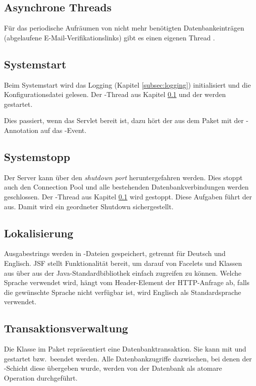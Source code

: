 \subsection{Asynchrone Threads}\label{subsec:threads}
Für das periodische Aufräumen von nicht mehr benötigten Datenbankeinträgen (abgelaufene E-Mail-Verifikationslinks) gibt es einen eigenen Thread .

\subsection{Systemstart}\label{subsec:systemstart}
Beim Systemstart wird das Logging (Kapitel \ref{subsec:logging}) initialisiert und die Konfigurationsdatei gelesen. Der -Thread aus Kapitel \ref{subsec:threads} und der  werden gestartet.

Dies passiert, wenn das Servlet bereit ist, dazu hört der  aus dem Paket  mit der -Annotation auf das -Event.

\subsection{Systemstopp}\label{subsec:systemstopp}
Der Server kann über den \emph{shutdown port} heruntergefahren werden. Dies stoppt auch den Connection Pool und alle bestehenden Datenbankverbindungen werden geschlossen.
Der -Thread aus Kapitel \ref{subsec:threads} wird gestoppt.
Diese Aufgaben führt der  aus.
Damit wird ein geordneter Shutdown sichergestellt.

\subsection{Lokalisierung}\label{subsec:lokalisierung}
Ausgabestrings werden in -Dateien gespeichert, getrennt für Deutsch und Englisch.
JSF stellt Funktionalität bereit, um darauf von Facelets und Klassen aus über  aus der Java-Standardbibliothek einfach zugreifen zu können.
Welche Sprache verwendet wird, hängt vom Header-Element  der HTTP-Anfrage ab, falls die gewünschte Sprache nicht verfügbar ist, wird Englisch als Standardsprache verwendet.


\subsection{Transaktionsverwaltung}\label{subsec:lokalisierung}
Die Klasse  im Paket  repräsentiert eine Datenbanktransaktion.
Sie kann mit  und  gestartet bzw.\ beendet werden.
Alle Datenbankzugriffe dazwischen, bei denen der -Schicht diese  übergeben wurde, werden von der Datenbank als atomare Operation durchgeführt.